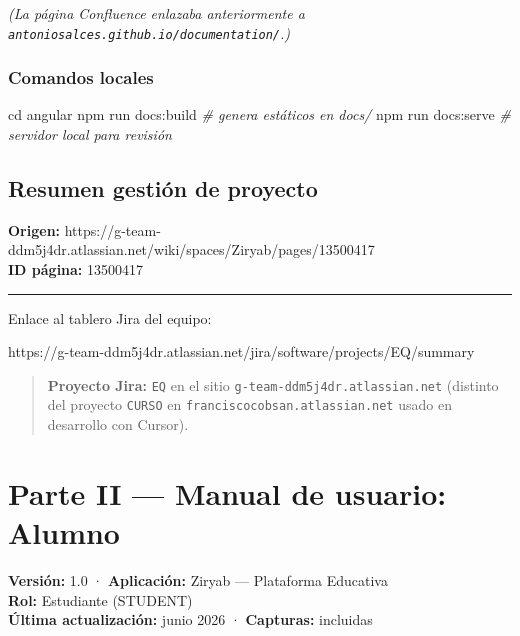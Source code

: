 \documentclass[
  spanish,
  11pt,
]{report}
\newenvironment{Shaded}{}{}
\newcommand{\BuiltInTok}[1]{\textcolor[rgb]{0.00,0.50,0.00}{#1}}
\newcommand{\CommentTok}[1]{\textcolor[rgb]{0.38,0.63,0.69}{\textit{#1}}}
\newcommand{\ExtensionTok}[1]{#1}
\newcommand{\NormalTok}[1]{#1}
\begin{document}
\emph{(La página Confluence enlazaba anteriormente a
\texttt{antoniosalces.github.io/documentation/}.)}

\subsection{Comandos locales}\label{comandos-locales}

\begin{Shaded}
\begin{Highlighting}[]
\BuiltInTok{cd}\NormalTok{ angular}
\ExtensionTok{npm}\NormalTok{ run docs:build    }\CommentTok{\# genera estáticos en docs/}
\ExtensionTok{npm}\NormalTok{ run docs:serve    }\CommentTok{\# servidor local para revisión}
\end{Highlighting}
\end{Shaded}

\section{Resumen gestión de
proyecto}\label{resumen-gestiuxf3n-de-proyecto}

\textbf{Origen:}
https://g-team-ddm5j4dr.atlassian.net/wiki/spaces/Ziryab/pages/13500417\\
\textbf{ID página:} 13500417

\begin{center}\rule{0.5\linewidth}{0.5pt}\end{center}

Enlace al tablero Jira del equipo:

https://g-team-ddm5j4dr.atlassian.net/jira/software/projects/EQ/summary

\begin{quote}
\textbf{Proyecto Jira:} \texttt{EQ} en el sitio
\texttt{g-team-ddm5j4dr.atlassian.net} (distinto del proyecto
\texttt{CURSO} en \texttt{franciscocobsan.atlassian.net} usado en
desarrollo con Cursor).
\end{quote}

\newpage

\chapter{Parte II --- Manual de usuario:
Alumno}\label{parte-ii-manual-de-usuario-alumno}

\textbf{Versión:} 1.0 · \textbf{Aplicación:} Ziryab --- Plataforma
Educativa\\
\textbf{Rol:} Estudiante (STUDENT)\\
\textbf{Última actualización:} junio 2026 · \textbf{Capturas:} incluidas
\end{document}
